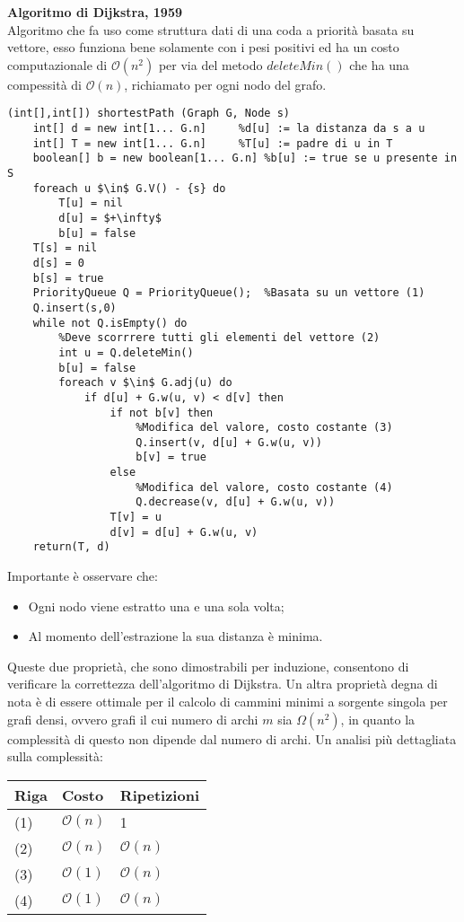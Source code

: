 \documentclass[../cheatSheetAlgoritmi.tex]{subfiles}
\begin{document}
\begin{flushleft}
\textbf{Algoritmo di Dijkstra, 1959}\\
Algoritmo che fa uso come struttura dati di una coda a priorità basata su vettore, esso funziona bene solamente con i pesi positivi ed ha un costo computazionale di $\mathcal{O}(n^2)$ per via del metodo $deleteMin()$ che ha una compessità di $\mathcal{O}(n)$, richiamato per ogni nodo del grafo.
\begin{lstlisting}[caption=Algoritmo di Edsger W. Dijkstra: cammini minimi a sorgente singola]
(int[],int[]) shortestPath (Graph G, Node s)
	int[] d = new int[1... G.n]		%d[u] := la distanza da s a u 
	int[] T = new int[1... G.n]		%T[u] := padre di u in T
	boolean[] b = new boolean[1... G.n]	%b[u] := true se u presente in S 
	foreach u $\in$ G.V() - {s} do
		T[u] = nil
		d[u] = $+\infty$
		b[u] = false
	T[s] = nil
	d[s] = 0
	b[s] = true
	PriorityQueue Q = PriorityQueue();	%Basata su un vettore (1)
	Q.insert(s,0)
	while not Q.isEmpty() do 
		%Deve scorrrere tutti gli elementi del vettore (2)
		int u = Q.deleteMin()
		b[u] = false
		foreach v $\in$ G.adj(u) do
			if d[u] + G.w(u, v) < d[v] then 
				if not b[v] then
					%Modifica del valore, costo costante (3)
					Q.insert(v, d[u] + G.w(u, v)) 
					b[v] = true
				else
					%Modifica del valore, costo costante (4)
					Q.decrease(v, d[u] + G.w(u, v))
				T[v] = u 
				d[v] = d[u] + G.w(u, v)
	return(T, d)
\end{lstlisting}
\end{flushleft}
Importante è osservare che:
\begin{itemize}
	\item Ogni nodo viene estratto una e una sola volta;
	\item Al momento dell’estrazione la sua distanza è minima.
\end{itemize}
Queste due proprietà, che sono dimostrabili per induzione, consentono di verificare la correttezza dell'algoritmo di Dijkstra. Un altra proprietà degna di nota è di essere ottimale per il calcolo di cammini minimi a sorgente singola per grafi densi, ovvero grafi il cui numero di archi $m$ sia $\Omega(n^2)$, in quanto la complessità di questo non dipende dal numero di archi.
Un analisi più dettagliata sulla complessità:

\bigskip
\noindent
\begin{tabular}{@{}lll@{}}
\toprule
Riga & Costo & Ripetizioni    \\ \midrule
(1) & $\mathcal{O}(n)$     & 1           \\
(2)    & $\mathcal{O}(n)$     & $\mathcal{O}(n)$            \\
(3)    & $\mathcal{O}(1)$     & $\mathcal{O}(n)$             \\
(4)    & $\mathcal{O}(1)$     & $\mathcal{O}(n)$            \\ \bottomrule
\end{tabular}
\end{document}
